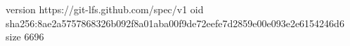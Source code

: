 version https://git-lfs.github.com/spec/v1
oid sha256:8ae2a5757868326b092f8a01aba00f9de72eefe7d2859e00e093e2e6154246d6
size 6696
